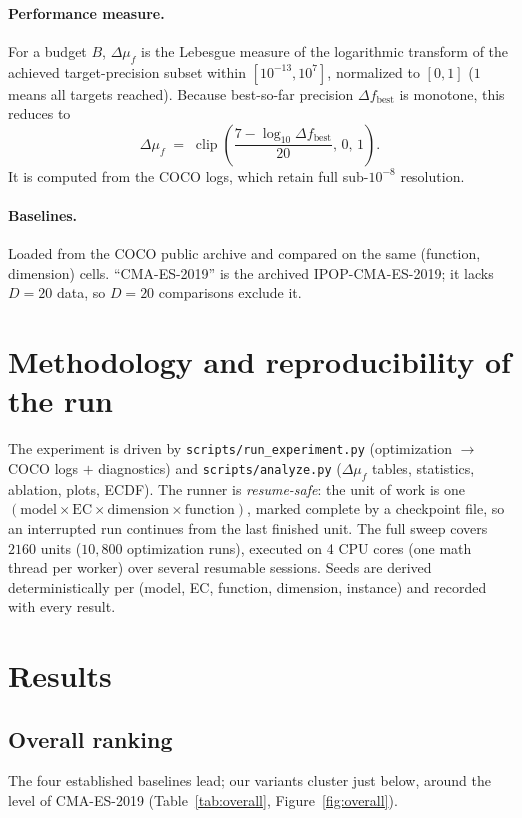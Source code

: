 \documentclass[11pt,a4paper]{article}
\newcommand{\dmf}{\Delta\mu_f}
\begin{document}
\paragraph{Performance measure.}
For a budget $B$, $\dmf$ is the Lebesgue measure of the logarithmic transform of the achieved
target-precision subset within $[10^{-13},10^{7}]$, normalized to $[0,1]$ ($1$ means all
targets reached). Because best-so-far precision $\Delta f_{\text{best}}$ is monotone, this
reduces to
\begin{equation}
\dmf \;=\; \operatorname{clip}\!\left(\frac{7-\log_{10}\Delta f_{\text{best}}}{20},\,0,\,1\right).
\end{equation}
It is computed from the COCO logs, which retain full sub-$10^{-8}$ resolution.

\paragraph{Baselines.}
Loaded from the COCO public archive \cite{coco2021} and compared on the same
(function, dimension) cells. ``CMA-ES-2019'' is the archived IPOP-CMA-ES-2019; it lacks
$D=20$ data, so $D=20$ comparisons exclude it.

\section{Methodology and reproducibility of the run}
The experiment is driven by \texttt{scripts/run\_experiment.py} (optimization $\rightarrow$
COCO logs $+$ diagnostics) and \texttt{scripts/analyze.py} ($\dmf$ tables, statistics, ablation,
plots, ECDF). The runner is \emph{resume-safe}: the unit of work is one
$(\text{model}\times\text{EC}\times\text{dimension}\times\text{function})$, marked complete by a
checkpoint file, so an interrupted run continues from the last finished unit. The full sweep
covers $2160$ units ($10{,}800$ optimization runs), executed on 4 CPU cores (one math thread per
worker) over several resumable sessions. Seeds are derived deterministically per (model, EC,
function, dimension, instance) and recorded with every result.

\section{Results}

\subsection{Overall ranking}
The four established baselines lead; our variants cluster just below, around the level of
CMA-ES-2019 (Table~\ref{tab:overall}, Figure~\ref{fig:overall}).
\end{document}

